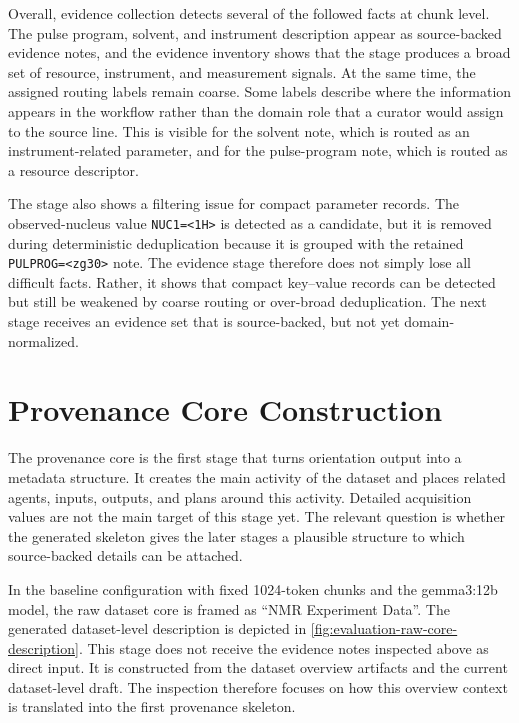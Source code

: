 Overall, evidence collection detects several of the followed facts at chunk level.
The pulse program, solvent, and instrument description appear as source-backed evidence notes, and the evidence inventory shows that the stage produces a broad set of resource, instrument, and measurement signals.
At the same time, the assigned routing labels remain coarse.
Some labels describe where the information appears in the workflow rather than the domain role that a curator would assign to the source line.
This is visible for the solvent note, which is routed as an instrument-related parameter, and for the pulse-program note, which is routed as a resource descriptor.

The stage also shows a filtering issue for compact parameter records.
The observed-nucleus value \texttt{NUC1=<1H>} is detected as a candidate, but it is removed during deterministic deduplication because it is grouped with the retained \texttt{PULPROG=<zg30>} note.
The evidence stage therefore does not simply lose all difficult facts.
Rather, it shows that compact key--value records can be detected but still be weakened by coarse routing or over-broad deduplication.
The next stage receives an evidence set that is source-backed, but not yet domain-normalized.

\section{Provenance Core Construction}
\label{sec:evaluation-core-construction-observations}

The provenance core is the first stage that turns orientation output into a metadata structure.
It creates the main activity of the dataset and places related agents, inputs, outputs, and plans around this activity.
Detailed acquisition values are not the main target of this stage yet.
The relevant question is whether the generated skeleton gives the later stages a plausible structure to which source-backed details can be attached.

In the baseline configuration with fixed 1024-token chunks and the gemma3:12b model, the raw dataset core is framed as \enquote{NMR Experiment Data}.
The generated dataset-level description is depicted in \cref{fig:evaluation-raw-core-description}.
This stage does not receive the evidence notes inspected above as direct input.
It is constructed from the dataset overview artifacts and the current dataset-level draft.
The inspection therefore focuses on how this overview context is translated into the first provenance skeleton.


